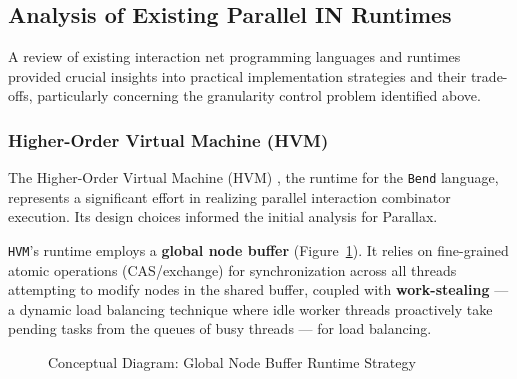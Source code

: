 \subsection{Analysis of Existing Parallel IN Runtimes}\label{sec:prep_research_runtimes}

A review of existing interaction net programming languages and runtimes provided crucial insights into practical implementation strategies and their trade-offs, particularly concerning the granularity control problem identified above.

\subsubsection{Higher-Order Virtual Machine (HVM)}

The Higher-Order Virtual Machine (HVM) \cite{HVMGithub}, the runtime for the \texttt{Bend} language, represents a significant effort in realizing parallel interaction combinator execution. Its design choices informed the initial analysis for Parallax.

\texttt{HVM}'s runtime employs a \textbf{global node buffer} (Figure~\ref{fig:prep_global_buffer}). It relies on fine-grained atomic operations (CAS/exchange) for synchronization across all threads attempting to modify nodes in the shared buffer, coupled with \textbf{work-stealing} --- a dynamic load balancing technique where idle worker threads proactively take pending tasks from the queues of busy threads --- for load balancing.

\begin{figure}[h!]
    \centering
    \caption{Conceptual Diagram: Global Node Buffer Runtime Strategy}
    \label{fig:prep_global_buffer}
\end{figure}

